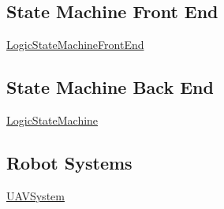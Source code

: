 \subsection*{State Machine Front End}


\begin{DoxyItemize}
\item \hyperlink{classLogicStateMachineFrontEnd}{Logic\-State\-Machine\-Front\-End}
\end{DoxyItemize}

\subsection*{State Machine Back End}


\begin{DoxyItemize}
\item \hyperlink{basic__state__machine_8h_ab0b6ef21baf57684550a2f05c771bd86}{Logic\-State\-Machine}
\end{DoxyItemize}

\subsection*{Robot Systems}


\begin{DoxyItemize}
\item \hyperlink{classUAVSystem}{U\-A\-V\-System} 
\end{DoxyItemize}